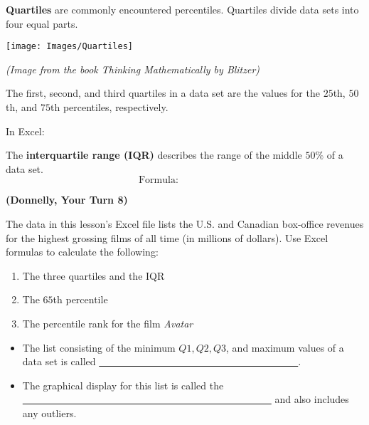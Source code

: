 \documentclass[12pt, letterpaper]{article}
\newcounter{exercise}
\theoremstyle{definition}
\begin{document}
\begin{defn}
\textbf{Quartiles} are commonly encountered percentiles.  Quartiles divide data sets into four equal parts.
\begin{center}
\texttt{[image: Images/Quartiles]}

\textit{(Image from the book \textit{Thinking Mathematically} by Blitzer)}
\end{center}

The first, second, and third quartiles in a data set are the values for the $25$th, $50$th, and $75$th percentiles, respectively.

\vspace*{.2in}
In Excel:
\vspace*{.2in}
\end{defn}


\begin{defn}
The \textbf{interquartile range (IQR)} describes the range of the middle $50\%$ of a data set.
$$ \text{Formula:}~~~~~~~~~~~~~~~~~~~~~~~~ $$

\vspace*{.3in}
\end{defn}

\begin{exercise} \textbf{(Donnelly, Your Turn 8)}

The data in this lesson's Excel file lists the U.S. and Canadian box-office revenues for the highest grossing films of all time (in millions of dollars).  Use Excel formulas to calculate the following:
\begin{enumerate}
\item The three quartiles and the IQR
\item The $65$th percentile
\item The percentile rank for the film \textit{Avatar}
\end{enumerate}

\end{exercise}

\vfill



\begin{defn}

\begin{itemize}

\item The list consisting of the minimum $Q1,Q2,Q3$, and maximum values of a data set is called \underline{~~~~~~~~~~~~~~~~~~~~~~~~~~~~~~~~~~~~~~~~}.

\vspace*{.3in}


\item The graphical display for this list is called the \underline{~~~~~~~~~~~~~~~~~~~~~~~~~~~~~~~~~~~~~~~~~~~~~~~~~~} and also includes any outliers.

\vspace*{.3in}

\end{itemize}

\end{defn}
\end{document}
